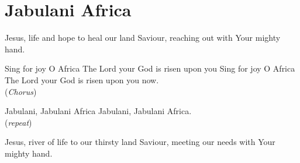 \starttocol
\chapter{Jabulani Africa}
\nexttocol
\hfill{\it }
\stoptocol
\startlines
J{\sc esus}, life and hope to heal our land
Saviour, reaching out with Your mighty hand.

Sing for joy O Africa
The Lord your God is risen upon you
Sing for joy O Africa
The Lord your God is risen upon you now.
     \hfill({\it Chorus})~~~~~~~~~~~~~~~~~~~~~~~~~~~

Jabulani, Jabulani Africa
Jabulani, Jabulani Africa.     \hfill({\it repeat})~~~~~~~~~~~~~~~~~~~~~~~~~~~

Jesus, river of life to our thirsty land
Saviour, meeting our needs with Your mighty hand.
\stoplines

